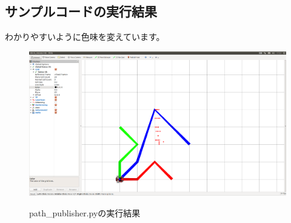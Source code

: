 \documentclass[11pt,a4paper]{jsarticle}
\begin{document}
\subsection*{サンプルコードの実行結果}
わかりやすいように色味を変えています。

\begin{figure}[h]
  \includegraphics[width=150mm]{./path_publisher.png}
  \label{path}
  \caption{path\_publisher.pyの実行結果}
\end{figure}





%
\end{document}
